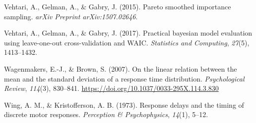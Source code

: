 \documentclass[,man,floatsintext]{apa6}
\begin{document}
\leavevmode\hypertarget{ref-vehtari2015pareto}{}%
Vehtari, A., Gelman, A., \& Gabry, J. (2015). Pareto smoothed importance sampling. \emph{arXiv Preprint arXiv:1507.02646}.

\leavevmode\hypertarget{ref-vehtari2017practical}{}%
Vehtari, A., Gelman, A., \& Gabry, J. (2017). Practical bayesian model evaluation using leave-one-out cross-validation and WAIC. \emph{Statistics and Computing}, \emph{27}(5), 1413--1432.

\leavevmode\hypertarget{ref-wagenmakers2007linear}{}%
Wagenmakers, E.-J., \& Brown, S. (2007). On the linear relation between the mean and the standard deviation of a response time distribution. \emph{Psychological Review}, \emph{114}(3), 830--841. \url{https://doi.org/10.1037/0033-295X.114.3.830}

\leavevmode\hypertarget{ref-wing1973response}{}%
Wing, A. M., \& Kristofferson, A. B. (1973). Response delays and the timing of discrete motor responses. \emph{Perception \& Psychophysics}, \emph{14}(1), 5--12.

\clearpage
\makeatletter
\efloat@restorefloats
\makeatother
\end{document}
